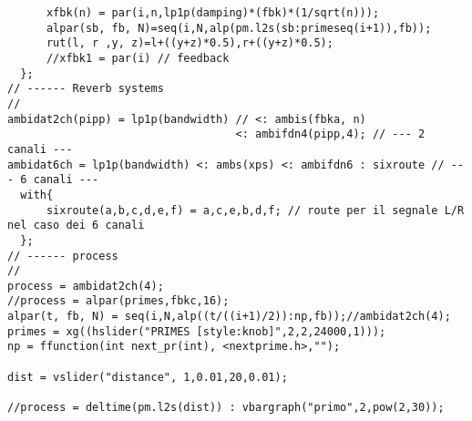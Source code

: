 \begin{lstlisting}
      xfbk(n) = par(i,n,lp1p(damping)*(fbk)*(1/sqrt(n)));
      alpar(sb, fb, N)=seq(i,N,alp(pm.l2s(sb:primeseq(i+1)),fb));
      rut(l, r ,y, z)=l+((y+z)*0.5),r+((y+z)*0.5);
      //xfbk1 = par(i) // feedback
  };
// ------ Reverb systems
//
ambidat2ch(pipp) = lp1p(bandwidth) // <: ambis(fbka, n)
                                   <: ambifdn4(pipp,4); // --- 2 canali ---
ambidat6ch = lp1p(bandwidth) <: ambs(xps) <: ambifdn6 : sixroute // --- 6 canali ---
  with{
      sixroute(a,b,c,d,e,f) = a,c,e,b,d,f; // route per il segnale L/R nel caso dei 6 canali
  };
// ------ process
//
process = ambidat2ch(4);
//process = alpar(primes,fbkc,16);
alpar(t, fb, N) = seq(i,N,alp((t/((i+1)/2)):np,fb));//ambidat2ch(4);
primes = xg((hslider("PRIMES [style:knob]",2,2,24000,1)));
np = ffunction(int next_pr(int), <nextprime.h>,"");

dist = vslider("distance", 1,0.01,20,0.01);

//process = deltime(pm.l2s(dist)) : vbargraph("primo",2,pow(2,30));
\end{lstlisting}

